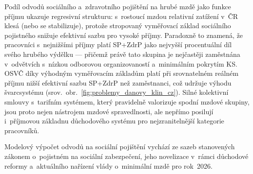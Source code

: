 Podíl odvodů sociálního a~zdravotního pojištění na hrubé mzdě jako funkce příjmu ukazuje regresivní strukturu: s~rostoucí mzdou relativní zatížení v~ČR klesá (nebo se stabilizuje), protože stropovaný vyměřovací základ sociálního pojistného snižuje efektivní sazbu pro vysoké příjmy.
Paradoxně to znamená, že pracovníci s~nejnižšími příjmy platí \ac{SP}+\ac{ZdrP} jako nejvyšší procentuální díl svého hrubého výdělku --- přičemž právě tato skupina je nejčastěji zaměstnána v~odvětvích s~nízkou odborovou organizovaností a~minimálním pokrytím \ac{KS}.
\Ac{OSVČ} díky výhodným vyměřovacím základům platí při srovnatelném reálném příjmu nižší efektivní sazbu \ac{SP}+\ac{ZdrP} než zaměstnanci, což udržuje výhodu švarcsystému (srov.~obr.~\ref{fig:problemy_danovy_klin_cz}).
Silné kolektivní smlouvy s~tarifním systémem, který pravidelně valorizuje spodní mzdové skupiny, jsou proto nejen nástrojem mzdové spravedlnosti, ale nepřímo posilují i~příjmovou základnu důchodového systému pro nejzranitelnější kategorie pracovníků.

Modelový výpočet odvodů na sociální pojištění vychází ze sazeb stanovených zákonem o~pojistném na sociální zabezpečení, jeho novelizace v~rámci důchodové reformy a~aktuálního nařízení vlády o~minimální mzdě pro rok~2026.~\cite{zakon_sp_1992}~\cite{zakon_duchreforma_2023}~\cite{nv_365_2025}\par


